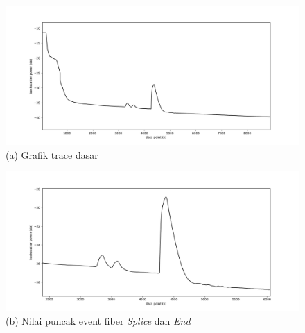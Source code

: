 \documentclass[12pt]{article}
\begin{document}
	
	\begin{figure}[!h]
		\centering
		\captionsetup{justification=centering}
		\includegraphics[width=\textwidth]{images/Bab_4/Bab_4_5e1}	
		\caption{\small{(a) Grafik trace dasar}}
	\end{figure}
	
	\newpage
	\begin{figure}[!h]
		\centering
		\captionsetup{justification=centering}
		\includegraphics[width=\textwidth]{images/Bab_4/Bab_4_5e2}	
		\caption{\small{(b) Nilai puncak event fiber \textit{Splice} dan \textit{End}}}
	\end{figure}
	
\end{document}
